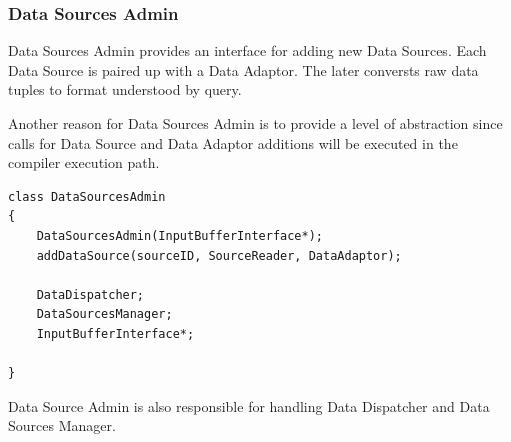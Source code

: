 \documentclass[14pt]{article}
\begin{document}
\subsubsection{Data Sources Admin}

Data Sources Admin provides an interface for adding new Data Sources. Each Data Source is paired up with a Data Adaptor. The later conversts raw data tuples to format understood by query.

Another reason for Data Sources Admin is to provide a level of abstraction since calls for Data Source and Data Adaptor additions will be executed in the compiler execution path. 

\begin{verbatim}
class DataSourcesAdmin
{
    DataSourcesAdmin(InputBufferInterface*);
    addDataSource(sourceID, SourceReader, DataAdaptor);

	DataDispatcher;
    DataSourcesManager;
	InputBufferInterface*;

}
\end{verbatim}
 
\noindent Data Source Admin is also responsible for handling Data Dispatcher and Data Sources Manager.






\end{document}
